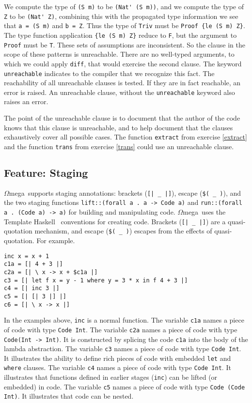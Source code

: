 \documentclass[11pt,twoside,A4]{llncs}
\newcommand{\om}{\emph{$\Omega$}mega}
\begin{document}
We compute the type of \verb+(S m)+ to be \verb+(Nat' (S m))+, and we compute
the type of \verb+Z+ to be \verb+(Nat' Z)+, combining this with
the propagated type information we see that {\tt a = (S m)} and {\tt b = Z}.
Thus the type of {\tt Triv} must be {\tt Proof \{le (S m) Z\}}.
The type function application {\tt \{le (S m) Z\}} reduce to {\tt F},
but the argument to {\tt Proof} must be {\tt T}.
These sets of assumptions
are inconsistent. So the clause in the
scope of these patterns is unreachable. There are no well-typed
arguments, to which we could apply {\tt diff}, that would
exercise the second clause. The keyword {\tt unreachable}
indicates to the compiler that we recognize this fact. 
The reachability of all unreachable clauses is tested.
If they are in fact reachable, an error is raised. An
unreachable clause, without the {\tt unreachable} keyword
also raises an error.

The point of the unreachable clause is to document that the author of the
code knows that this clause is unreachable, and to help document that the
clauses exhaustively cover all possible cases. The function {\tt extract}
from exercise \ref{extract} and the function {\tt trans} from exercise
\ref{trans} could use an unreachable clause.


\subsection{Feature: Staging} \label{stage}
\om\ supports staging annotations:
brackets ({\small \verb+[| _ |]+}),
escape ({\small \verb+$( _ )+}), and the two staging functions
{ {\tt lift::(forall a . a -> Code a)}} and 
{ {\tt run::(forall a . (Code a) -> a)}} 
for building and manipulating code. \om\ uses
the Template Haskell~\cite{Sheard02} conventions for creating code. 
Brackets  (\verb+[| _ |]+) are a quasi-quotation mechanism, and escape
(\verb+$( _ )+) escapes from the effects of quasi-quotation.
For example.

\vspace*{-.1in}
{\small
\begin{verbatim}
inc x = x + 1
c1a = [| 4 + 3 |]
c2a = [| \ x -> x + $c1a |]
c3 = [| let f x = y - 1 where y = 3 * x in f 4 + 3 |]
c4 = [| inc 3 |]
c5 = [| [| 3 |] |]
c6 = [| \ x -> x |]
\end{verbatim}}
\noindent
In the examples above, {\tt inc} is a normal function. The variable {\tt c1a} names a piece
of code with type {\small \verb+Code Int+}. The variable {\tt c2a} names a piece of code
with type {\small {\small \verb+Code(Int -> Int)+}}. It is constructed by
splicing the code {\tt c1a} into the body of the lambda abstraction.
The variable {\tt c3} names a piece of code with type {\small \verb+Code Int+}. It illustrates
the ability to define rich pieces of code with embedded
{\tt let} and {\tt where} clauses. The variable {\tt c4} names a piece
of code with type {\small \verb+Code Int+}. It illustrates that functions
defined in earlier stages ({\tt inc}) can be lifted (or embedded)
in code. The variable {\tt c5} names a piece
of code with type {\small \verb+Code (Code Int)+}. It illustrates that
code can be nested.
\end{document}
